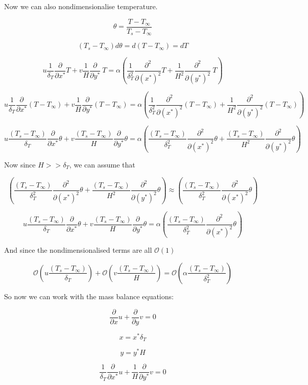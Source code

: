 \documentclass[11pt]{article}
\begin{document}
Now we can also nondimensionalise temperature.

$$\theta= \frac{T-T_\infty}{T_s - T_\infty}$$

$$(T_s - T_\infty) d \theta = d (T - T_\infty) =dT$$

$$ u \frac{1}{\delta_T} \frac{\partial}{\partial x^*} T + v \frac{1}{H} \frac{\partial }{\partial y^*} \ T  = \alpha ( \frac{1}{\delta_T^2} \frac{\partial^2}{\partial (x^*)^2} T + \frac{1}{H^2} \frac{\partial^2 }{\partial (y^*)^2} \ T) $$ 


$$ u \frac{1}{\delta_T} \frac{\partial}{\partial x^*} (T - T_\infty) + v \frac{1}{H} \frac{\partial }{\partial y^*}  (T - T_\infty)  = \alpha ( \frac{1}{\delta_T^2} \frac{\partial^2}{\partial (x^*)^2} (T - T_\infty) + \frac{1}{H^2} \frac{\partial^2 }{\partial (y^*)^2} (T - T_\infty)) $$ 

$$ u \frac{(T_s - T_\infty)}{\delta_T} \frac{\partial}{\partial x^*}\theta + v \frac{(T_s - T_\infty)}{H} \frac{\partial }{\partial y^*}  \theta  = \alpha ( \frac{(T_s - T_\infty)}{\delta_T^2} \frac{\partial^2}{\partial (x^*)^2} \theta + \frac{(T_s - T_\infty)}{H^2} \frac{\partial^2 }{\partial (y^*)^2} \theta) $$ 

Now since $H >> \delta_T$, we can assume that

$$( \frac{(T_s - T_\infty)}{\delta_T^2} \frac{\partial^2}{\partial (x^*)^2} \theta + \frac{(T_s - T_\infty)}{H^2} \frac{\partial^2 }{\partial (y^*)^2} \theta) \approx ( \frac{(T_s - T_\infty)}{\delta_T^2} \frac{\partial^2}{\partial (x^*)^2} \theta )$$

$$ u \frac{(T_s - T_\infty)}{\delta_T} \frac{\partial}{\partial x^*}\theta + v \frac{(T_s - T_\infty)}{H} \frac{\partial }{\partial y^*}  \theta  = \alpha ( \frac{(T_s - T_\infty)}{\delta_T^2} \frac{\partial^2}{\partial (x^*)^2} \theta ) $$ 

And since the nondimensionalised terms are all $\mathcal{O}(1)$

$$\mathcal{O}( u \frac{(T_s - T_\infty)}{\delta_T}) + \mathcal{O}(v \frac{(T_s - T_\infty)}{H}) = \mathcal{O}( \alpha  \frac{(T_s - T_\infty)}{\delta_T^2})$$


So now we can work with the mass balance equations:


$$  \frac{\partial}{\partial x} u +  \frac{\partial}{\partial y} v  = 0$$

$$ x = x^* \delta_T$$

$$y=y^* H$$


$$ \frac{1}{\delta_T} \frac{\partial}{\partial x^* } u + \frac{1}{H} \frac{\partial}{\partial y^*} v  = 0$$
\end{document}
